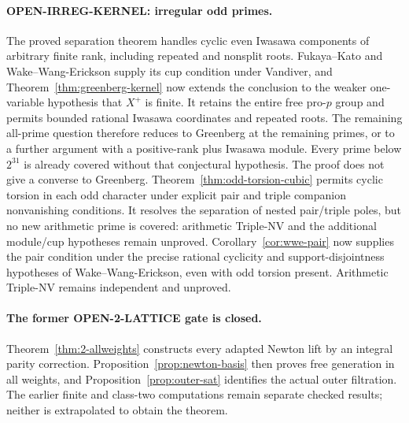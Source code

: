 \documentclass[11pt,a4paper]{article}
\theoremstyle{definition}
\begin{document}
\paragraph{OPEN-IRREG-KERNEL: irregular odd primes.}
The proved separation theorem handles cyclic even Iwasawa components of
arbitrary finite rank, including repeated and nonsplit roots.
Fukaya--Kato and Wake--Wang-Erickson supply its cup condition under
Vandiver, and Theorem~\ref{thm:greenberg-kernel} now extends the
conclusion to the weaker one-variable hypothesis that $X^+$ is finite.
It retains the entire free pro-$p$ group and permits bounded rational
Iwasawa coordinates and repeated roots. The remaining all-prime
question therefore reduces to Greenberg at the remaining primes, or
to a further argument with a positive-rank plus Iwasawa module.
Every prime below $2^{31}$ is already covered without that conjectural
hypothesis. The proof does not give a converse to Greenberg.
Theorem~\ref{thm:odd-torsion-cubic} permits cyclic torsion in each
odd character under explicit pair and triple companion nonvanishing
conditions. It resolves the separation of nested pair/triple poles,
but no new arithmetic prime is covered: arithmetic Triple-NV and
the additional module/cup hypotheses remain unproved.
Corollary~\ref{cor:wwe-pair} now supplies the pair condition under
the precise rational cyclicity and support-disjointness hypotheses
of Wake--Wang-Erickson, even with odd torsion present. Arithmetic
Triple-NV remains independent and unproved.

\paragraph{The former OPEN-2-LATTICE gate is closed.}
Theorem~\ref{thm:2-allweights} constructs every adapted Newton lift
by an integral parity correction. Proposition~\ref{prop:newton-basis}
then proves free generation in all weights, and
Proposition~\ref{prop:outer-sat} identifies the actual outer filtration.
The earlier finite and class-two computations remain separate checked
results; neither is extrapolated to obtain the theorem.
\end{document}

